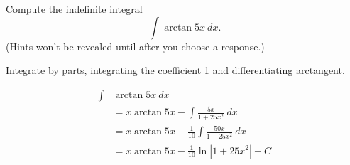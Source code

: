 \documentclass{ximera}
\begin{document}
\begin{question}%

Compute the indefinite integral 
\[\int \arctan 5x ~ dx.\]
(Hints won't be revealed until after you choose a response.)
\begin{multiplechoice}
\end{multiplechoice}
\begin{feedback}
Integrate by parts, integrating the coefficient 1 and differentiating arctangent.
\begin{hint}
\[\begin{aligned}
    \int & \arctan 5x ~ dx \\
    & = x \arctan 5x - \int \frac{5x}{1+25x^2} ~ dx \\
    & = x \arctan 5x - \frac{1}{10} \int \frac{50x}{1+25x^2} ~ dx \\
    & = x \arctan 5x - \frac{1}{10} \ln | 1 + 25x^2|  + C
\end{aligned}\]
\end{hint}
\end{feedback}

\end{question}
\end{document}
